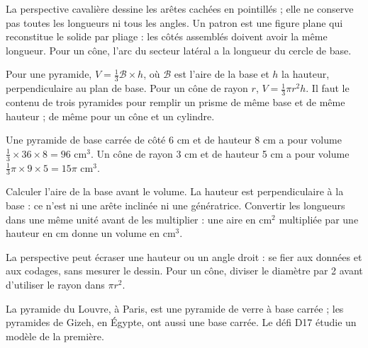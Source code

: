 \begin{savoirfaire}La perspective cavalière dessine les arêtes cachées en pointillés ; elle ne conserve pas toutes les longueurs ni tous les angles. Un patron est une figure plane qui reconstitue le solide par pliage : les côtés assemblés doivent avoir la même longueur. Pour un cône, l’arc du secteur latéral a la longueur du cercle de base.\end{savoirfaire}
\clearpage
{}\label{cours-17-2}
\begin{propriete}Pour une pyramide, $V=\frac13\mathcal B\times h$, où $\mathcal B$ est l’aire de la base et $h$ la hauteur, perpendiculaire au plan de base. Pour un cône de rayon $r$, $V=\frac13\pi r^2h$. Il faut le contenu de trois pyramides pour remplir un prisme de même base et de même hauteur ; de même pour un cône et un cylindre.\end{propriete}
\begin{exemple}Une pyramide de base carrée de côté 6 cm et de hauteur 8 cm a pour volume $\frac13\times36\times8=96$ cm$^3$. Un cône de rayon 3 cm et de hauteur 5 cm a pour volume $\frac13\pi\times9\times5=15\pi$ cm$^3$.\end{exemple}
\begin{savoirfaire}Calculer l’aire de la base avant le volume. La hauteur est perpendiculaire à la base : ce n’est ni une arête inclinée ni une génératrice. Convertir les longueurs dans une même unité avant de les multiplier : une aire en cm$^2$ multipliée par une hauteur en cm donne un volume en cm$^3$.\end{savoirfaire}
\begin{attention}La perspective peut écraser une hauteur ou un angle droit : se fier aux données et aux codages, sans mesurer le dessin. Pour un cône, diviser le diamètre par 2 avant d’utiliser le rayon dans $\pi r^2$.\end{attention}
\begin{exemple}La pyramide du Louvre, à Paris, est une pyramide de verre à base carrée ; les pyramides de Gizeh, en Égypte, ont aussi une base carrée. Le défi D17 étudie un modèle de la première.\end{exemple}

